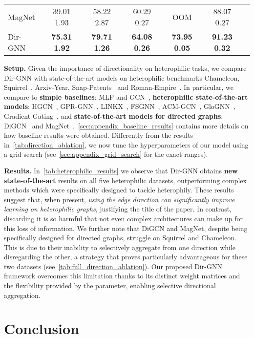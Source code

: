\documentclass{article}
\newcommand\oursacro{Dir-GNN}
\theoremstyle{plain}
\theoremstyle{definition}
\theoremstyle{remark}
\begin{document}
\begin{table*}[t]
\begin{center}
\begin{small}
\begin{sc}
{\begin{tabular}{lcccccr}
MagNet       &  39.01  1.93           &  58.22  2.87           &  60.29  0.27           &  OOM                        &  88.07  0.27          \\
\hdashline
\oursacro{}  &  \textbf{75.31  1.92}  &  \textbf{79.71  1.26}  &  \textbf{64.08  0.26}  &  \textbf{73.95  0.05}  &  \textbf{91.23  0.32} \\
\bottomrule
\end{tabular}}
\end{sc}
\end{small}
\end{center}
\caption{Results on real-world directed heterophilic datasets. OOM indicates out of memory. }
\label{tab:heterophilic_results}
\end{table*}
 
\textbf{Setup.} Given the importance of directionality on heterophilic tasks, we compare Dir-GNN with state-of-the-art models on heterophilic benchmarks Chameleon, Squirrel~\cite{pei2020geom}, Arxiv-Year, Snap-Patents~\cite{lim2021large} and Roman-Empire~\cite{platonov2023a}. In particular, we compare to \textbf{simple baselines}: MLP and GCN~\cite{kipf2016semi}, \textbf{heterophilic state-of-the-art models}: HGCN~\cite{zhu2020beyond}, GPR-GNN~\cite{chien2020adaptive}, LINKX~\cite{lim2021large}, FSGNN~\cite{maurya2021improving}, ACM-GCN~\cite{luan2022revisiting}, GloGNN~\cite{li2022finding}, Gradient Gating~\cite{rusch2022gradient}, and \textbf{state-of-the-art models for directed graphs}: DiGCN~\cite{digraph} and MagNet~\cite{zhang2021magnet}.~\cref{sec:appendix_baseline_results} contains more details on how baseline results were obtained. Differently from the results in~\cref{tab:direction_ablation}, we now tune the hyperparameters of our model using a grid search (see~\cref{sec:appendix_grid_search} for the exact ranges).


\textbf{Results.} In~\cref{tab:heterophilic_results} we observe that \oursacro{} obtains {\bf new state-of-the-art} results on all five heterophilic datasets, outperforming complex methods which were specifically designed to tackle heterophily. These results suggest that, when present, {\em using the edge direction can significantly improve learning on heterophilic graphs}, justifying the title of the paper. In contrast, discarding it is so harmful that not even complex architectures can make up for this loss of information. We further note that DiGCN and MagNet, despite being specifically designed for directed graphs, struggle on Squirrel and Chameleon. This is due to their inability to selectively aggregate from one direction while disregarding the other, a strategy that proves particularly advantageous for these two datasets (see~\cref{tab:full_direction_ablation}). Our proposed \oursacro{} framework overcomes this limitation thanks to its distinct weight matrices and the flexibility provided by the  parameter, enabling selective directional aggregation. \section{Conclusion}
\label{sec:conclusion}
\end{document}
